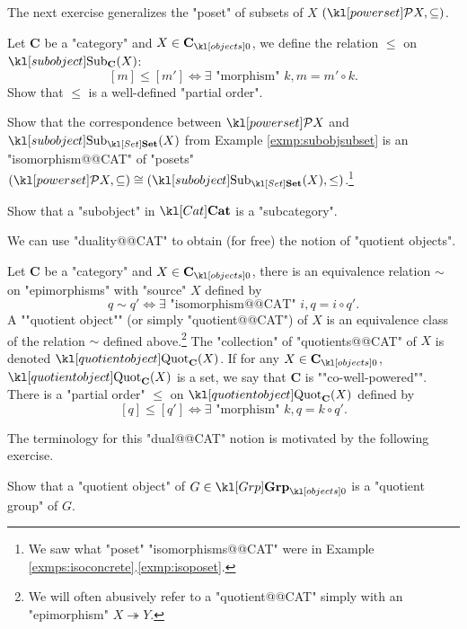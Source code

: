 \documentclass[main.tex]{subfiles}
\begin{document}
The next exercise generalizes the "poset" of subsets of $X$ $(\mP X, \subseteq)$.
\begin{exer}\label{exer:duality:posetsubobj}
	Let $\mathbf{C}$ be a "category" and $X \in \obj{\mathbf{C}}$, we define the relation $\leq$ on $\Sub_{\mathbf{C}}(X)$: 
	\[[m] \leq [m'] \Leftrightarrow \exists \text{ "morphism" } k,  m = m' \circ k.\]
	Show that $\leq$ is a well-defined "partial order".
\end{exer}
\begin{exer}\label{exer:duality:posetsubset}
	Show that the correspondence between $\mP X$ and $\Sub_{\catSet}(X)$ from Example \ref{exmp:subobjsubset} is an "isomorphism@@CAT" of "posets" $(\mP X, \subseteq) \cong (\Sub_{\catSet}(X), \leq)$.\footnote{We saw what "poset" "isomorphisms@@CAT" were in Example \ref{exmps:isoconcrete}.\ref{exmp:isoposet}.}
\end{exer}
\begin{exer}\label{exer:duality:subobjccat}
	Show that a "subobject" in $\catCat$ is a "subcategory".
\end{exer}
We can use "duality@@CAT" to obtain (for free) the notion of "quotient objects".
\begin{defn}[Quotients]
	Let $\mathbf{C}$ be a "category" and $X \in \obj{\mathbf{C}}$, there is an equivalence relation $\sim$ on "epimorphisms" with "source" $X$ defined by \[q \sim q' \Leftrightarrow \exists \text{ "isomorphism@@CAT" } i,  q = i \circ q'.\]
	\AP A ""quotient object"" (or simply "quotient@@CAT") of $X$ is an equivalence class of the relation $\sim$ defined above.\footnote{We will often abusively refer to a "quotient@@CAT" simply with an "epimorphism" $X \twoheadrightarrow Y$.} The "collection" of "quotients@@CAT" of $X$ is denoted $\Quot_{\mathbf{C}}(X)$. \AP If for any $X \in \obj{\mathbf{C}}$, $\Quot_{\mathbf{C}}(X)$ is a set, we say that $\mathbf{C}$ is ""co-well-powered"". There is a "partial order" $\leq$ on $\Quot_{\mathbf{C}}(X)$ defined by 
	\[[q] \leq [q'] \Leftrightarrow \exists \text{ "morphism" } k,  q = k \circ q'.\]
\end{defn}
The terminology for this "dual@@CAT" notion is motivated by the following exercise.
\begin{exer}\label{exer:duality:quotientgrp}
	Show that a "quotient object" of $G \in \obj{\catGrp}$ is a "quotient group" of $G$.
\end{exer}
\end{document}
